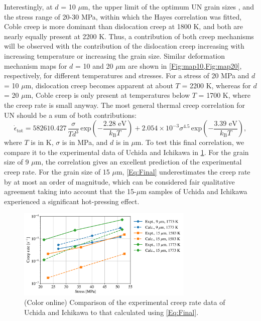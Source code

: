 \documentclass[preprint,12pt,sort&compress]{elsarticle}
\newcommand{\?}{\stackrel{?}{=}}
\begin{document}
Interestingly, at $d$ = 10 $\mu$m, the upper limit of the optimum UN grain sizes \cite{Johnson2018}, and the stress range of 20-30 MPa, within which the Hayes correlation was fitted, Coble creep is more dominant than dislocation creep at 1800 K, and both are nearly equally present at 2200 K. Thus, a contribution of both creep mechanisms will be observed with the contribution of the dislocation creep increasing with increasing temperature or increasing the grain size. Similar deformation mechanism maps for $d$ = 10 and 20 $\mu$m are shown in \cref{Fig:map10,Fig:map20}, respectively, for different temperatures and stresses. For a stress of 20 MPa and $d$ = 10 $\mu$m, dislocation creep becomes apparent at about $T$ = 2200 K, whereas for $d$ = 20 $\mu$m, Coble creep is only present at temperatures below $T$ = 1700 K, where the creep rate is small anyway. The most general thermal creep correlation for UN should be a sum of both contributions:
\begin{equation}
    \Dot{\epsilon}_\mathrm{tot} = 582610.427 \, \frac{\sigma}{T d^3} \, \mathrm{exp} \! \left( - \frac{2.28 \text{ eV}}{k_\mathrm{B} T} \right) + 2.054 \times 10^{-3} \sigma^{4.5} \, \mathrm{exp} \! \left( - \frac{3.39 \text{ eV}}{k_\mathrm{B} T} \right),
    \label{Eq:Final}
\end{equation}
where $T$ is in K, $\sigma$ is in MPa, and $d$ is in $\mu$m. To test this final correlation, we compare it to the experimental data of Uchida and Ichikawa \cite{Uchida1973} in \cref{Fig:Final}. For the grain size of 9 $\mu$m, the correlation gives an excellent prediction of the experimental creep rate. For the grain size of 15 $\mu$m, \cref{Eq:Final} underestimates the creep rate by at most an order of magnitude, which can be considered fair qualitative agreement taking into account that the 15-$\mu$m samples of Uchida and Ichikawa \cite{Uchida1973} experienced a significant hot-pressing effect.

\begin{figure}[h!]
    \centering
    \includegraphics[width=0.75\textwidth]{Final.png}
    \caption{(Color online) Comparison of the experimental creep rate data of Uchida and Ichikawa \cite{Uchida1973} to that calculated using \cref{Eq:Final}.}
    \label{Fig:Final}
\end{figure}
\end{document}
